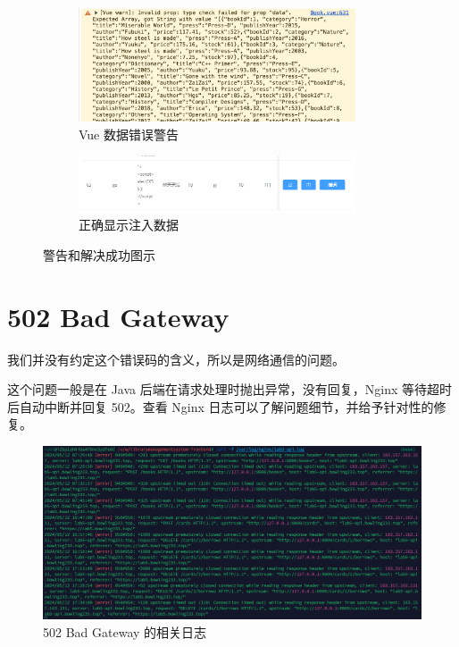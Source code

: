 \documentclass[a4paper,oneside]{ctexbook}
\begin{document}
\begin{figure}[!h]
\centering
    \begin{subfigure}{0.5\linewidth}
    \centering
    \includegraphics[width=0.9\textwidth]{attack-json-warning.png}
    \caption{Vue 数据错误警告}
    \label{fig:vue}
    \end{subfigure}%
    \begin{subfigure}{0.5\linewidth}
    \centering
    \includegraphics[width=0.9\textwidth]{attack-fin.png}
    \caption{正确显示注入数据}
    \end{subfigure}
    \caption{警告和解决成功图示}
\end{figure}

\section{502 Bad Gateway}

我们并没有约定这个错误码的含义，所以是网络通信的问题。

这个问题一般是在 Java 后端在请求处理时抛出异常，没有回复，Nginx 等待超时后自动中断并回复 502。查看 Nginx 日志可以了解问题细节，并给予针对性的修复。

\begin{figure}[!h]
    \centering
    \includegraphics[width=\textwidth]{nginx.png}
    \caption{502 Bad Gateway 的相关日志}
    \label{fig:502}
\end{figure}
\end{document}
